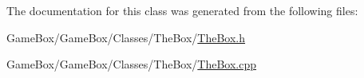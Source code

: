 \-The documentation for this class was generated from the following files\-:\begin{DoxyCompactItemize}
\item 
\-Game\-Box/\-Game\-Box/\-Classes/\-The\-Box/\hyperlink{_the_box_8h}{\-The\-Box.\-h}\item 
\-Game\-Box/\-Game\-Box/\-Classes/\-The\-Box/\hyperlink{_the_box_8cpp}{\-The\-Box.\-cpp}\end{DoxyCompactItemize}
